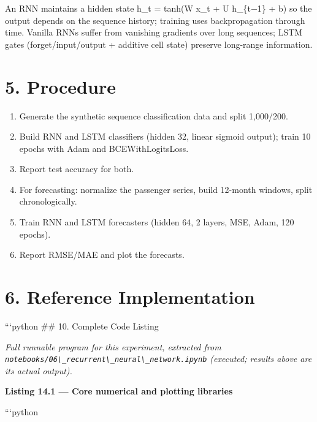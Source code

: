 An RNN maintains a hidden state h\_t = tanh(W x\_t + U h\_\{t−1\} + b)
so the output depends on the sequence history; training uses
backpropagation through time. Vanilla RNNs suffer from vanishing
gradients over long sequences; LSTM gates (forget/input/output +
additive cell state) preserve long-range information.

\section{5. Procedure}\label{procedure}

\begin{enumerate}
\def\labelenumi{\arabic{enumi}.}
\tightlist
\item
  Generate the synthetic sequence classification data and split
  1,000/200.
\item
  Build RNN and LSTM classifiers (hidden 32, linear sigmoid output);
  train 10 epochs with Adam and BCEWithLogitsLoss.
\item
  Report test accuracy for both.
\item
  For forecasting: normalize the passenger series, build 12-month
  windows, split chronologically.
\item
  Train RNN and LSTM forecasters (hidden 64, 2 layers, MSE, Adam, 120
  epochs).
\item
  Report RMSE/MAE and plot the forecasts.
\end{enumerate}

\section{6. Reference Implementation}\label{reference-implementation}

```python \#\# 10. Complete Code Listing

\emph{Full runnable program for this experiment, extracted from
\passthrough{\lstinline!notebooks/06\_recurrent\_neural\_network.ipynb!}
(executed; results above are its actual output).}

\textbf{Listing 14.1 --- Core numerical and plotting libraries}

```python
